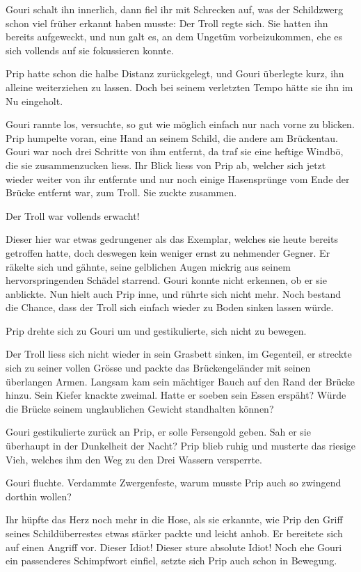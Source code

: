 Gouri schalt ihn innerlich, dann fiel ihr mit Schrecken auf, was der Schildzwerg schon viel früher erkannt haben musste: Der Troll regte sich. Sie hatten ihn bereits aufgeweckt, und nun galt es, an dem Ungetüm vorbeizukommen, ehe es sich vollends auf sie fokussieren konnte.

Prip hatte schon die halbe Distanz zurückgelegt, und Gouri überlegte kurz, ihn alleine weiterziehen zu lassen. Doch bei seinem verletzten Tempo hätte sie ihn im Nu eingeholt.

Gouri rannte los, versuchte, so gut wie möglich einfach nur nach vorne zu blicken. Prip humpelte voran, eine Hand an seinem Schild, die andere am Brückentau. Gouri war noch drei Schritte von ihm entfernt, da traf sie eine heftige Windbö, die sie zusammenzucken liess. Ihr Blick liess von Prip ab, welcher sich jetzt wieder weiter von ihr entfernte und nur noch einige Hasensprünge vom Ende der Brücke entfernt war, zum Troll. Sie zuckte zusammen.

Der Troll war vollends erwacht!

Dieser hier war etwas gedrungener als das Exemplar, welches sie heute bereits getroffen hatte, doch deswegen kein weniger ernst zu nehmender Gegner. Er räkelte sich und gähnte, seine gelblichen Augen mickrig aus seinem hervorspringenden Schädel starrend. Gouri konnte nicht erkennen, ob er sie anblickte. Nun hielt auch Prip inne, und rührte sich nicht mehr. Noch bestand die Chance, dass der Troll sich einfach wieder zu Boden sinken lassen würde.

Prip drehte sich zu Gouri um und gestikulierte, sich nicht zu bewegen.

Der Troll liess sich nicht wieder in sein Grasbett sinken, im Gegenteil, er streckte sich zu seiner vollen Grösse und packte das Brückengeländer mit seinen überlangen Armen. Langsam kam sein mächtiger Bauch auf den Rand der Brücke hinzu. Sein Kiefer knackte zweimal. Hatte er soeben sein Essen erspäht? Würde die Brücke seinem unglaublichen Gewicht standhalten können?

Gouri gestikulierte zurück an Prip, er solle Fersengold geben. Sah er sie überhaupt in der Dunkelheit der Nacht? Prip blieb ruhig und musterte das riesige Vieh, welches ihm den Weg zu den Drei Wassern versperrte.

Gouri fluchte. Verdammte Zwergenfeste, warum musste Prip auch so zwingend dorthin wollen?

Ihr hüpfte das Herz noch mehr in die Hose, als sie erkannte, wie Prip den Griff seines Schildüberrestes etwas stärker packte und leicht anhob. Er bereitete sich auf einen Angriff vor. Dieser Idiot! Dieser sture absolute Idiot! Noch ehe Gouri ein passenderes Schimpfwort einfiel, setzte sich Prip auch schon in Bewegung.

